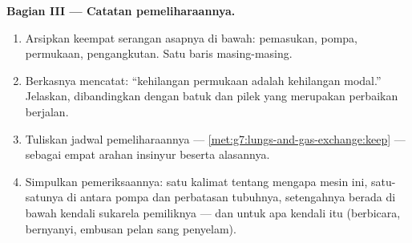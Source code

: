 \begin{problem}
\medskip\noindent\textbf{Bagian III --- Catatan
pemeliharaannya.}
\begin{enumerate}[resume]
  \item Arsipkan keempat serangan asapnya di bawah: pemasukan, pompa,
        permukaan, pengangkutan. Satu baris masing-masing.
  \item Berkasnya mencatat: ``kehilangan permukaan adalah kehilangan
        modal.'' Jelaskan, dibandingkan dengan batuk dan pilek yang
        merupakan perbaikan berjalan.
  \item Tuliskan jadwal pemeliharaannya ---
        \cref{met:g7:lungs-and-gas-exchange:keep} --- sebagai empat
        arahan insinyur beserta alasannya.
  \item Simpulkan pemeriksaannya: satu kalimat tentang mengapa mesin
        ini, satu-satunya di antara pompa dan perbatasan tubuhnya,
        setengahnya berada di bawah kendali sukarela pemiliknya ---
        dan untuk apa kendali itu (berbicara, bernyanyi, embusan pelan
        sang penyelam).
\end{enumerate}
\end{problem}
